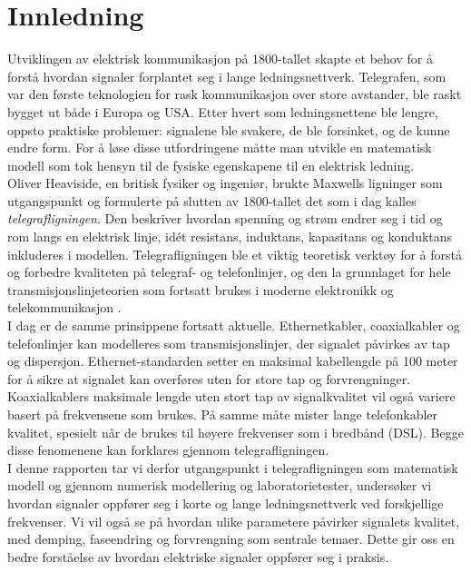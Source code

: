\section{Innledning}

Utviklingen av elektrisk kommunikasjon på 1800-tallet skapte et behov for å forstå hvordan 
signaler forplantet seg i lange ledningsnettverk. Telegrafen, som var den første teknologien 
for rask kommunikasjon over store avstander, ble raskt bygget ut både i Europa og USA. Etter hvert 
som ledningsnettene ble lengre, oppsto praktiske problemer: signalene ble svakere, de ble 
forsinket, og de kunne endre form. For å løse disse utfordringene måtte man utvikle en matematisk 
modell som tok hensyn til de fysiske egenskapene til en elektrisk ledning.
\\[1em]
Oliver Heaviside, en britisk fysiker og ingeniør, brukte Maxwells ligninger som utgangspunkt og 
formulerte på slutten av 1800-tallet det som i dag kalles \textit{telegrafligningen}. Den beskriver 
hvordan spenning og strøm endrer seg i tid og rom langs en elektrisk linje, idét 
resistans, induktans, kapasitans og konduktans inkluderes i modellen. Telegrafligningen ble et viktig teoretisk verktøy 
for å forstå og forbedre kvaliteten på telegraf- og telefonlinjer, og den la grunnlaget for hele 
transmisjonslinjeteorien som fortsatt brukes i moderne elektronikk og telekommunikasjon \cite{geeksforgeeks_telegrapher}.
\\[1em]
I dag er de samme prinsippene fortsatt aktuelle. Ethernetkabler, coaxialkabler og telefonlinjer kan modelleres 
som transmisjonslinjer, der signalet påvirkes av tap og dispersjon. Ethernet-standarden setter en 
maksimal kabellengde på 100 meter for å sikre at signalet kan overføres uten for store tap og 
forvrengninger. Koaxialkablers maksimale lengde uten stort tap av signalkvalitet vil også variere basert på frekvensene 
som brukes. På samme måte mister lange telefonkabler kvalitet, spesielt når de brukes til høyere 
frekvenser som i bredbånd (DSL). Begge disse fenomenene kan forklares gjennom telegrafligningen.
\\[1em]
I denne rapporten tar vi derfor utgangspunkt i telegrafligningen som matematisk modell og gjennom numerisk
modellering og laboratorietester, undersøker vi hvordan signaler oppfører seg i korte og 
lange ledningsnettverk ved forskjellige frekvenser. Vi vil også se på hvordan ulike parametere påvirker 
signalets kvalitet, med demping, faseendring og forvrengning som sentrale temaer. Dette gir oss en bedre forståelse av
hvordan elektriske signaler oppfører seg i praksis. 